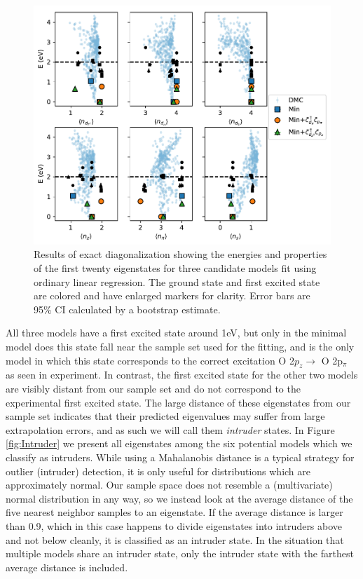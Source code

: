 \documentclass{article}
\begin{document}
\begin{figure}[H]
\centering
\includegraphics[width=0.7\linewidth]{../qwalk/old/ub3lyp_s1_/analysis/figs/init_ed.pdf}
\caption{Results of exact diagonalization showing the energies and properties of the first twenty eigenstates for three candidate models fit using ordinary linear regression. The ground state and first excited state are colored and have enlarged markers for clarity. Error bars are 95\% CI calculated by a bootstrap estimate.}
\label{fig:InitED}
\end{figure}

All three models have a first excited state around 1eV, but only in the minimal model does this state fall near the sample set used for the fitting, and is the only model in which this state corresponds to the correct excitation O 2$p_z \rightarrow $ O 2p$_\pi$ as seen in experiment.
In contrast, the first excited state for the other two models are visibly distant from our sample set and do not correspond to the experimental first excited state.
The large distance of these eigenstates from our sample set indicates that their predicted eigenvalues may suffer from large extrapolation errors, and as such we will call them \textit{intruder} states.
In Figure \ref{fig:Intruder} we present all eigenstates among the six potential models which we classify as intruders.
While using a Mahalanobis distance is a typical strategy for outlier (intruder) detection, it is only useful for distributions which are approximately normal.
Our sample space does not resemble a (multivariate) normal distribution in any way, so we instead look at the average distance of the five nearest neighbor samples to an eigenstate.
If the average distance is larger than 0.9, which in this case happens to divide eigenstates into intruders above and not below cleanly, it is classified as an intruder state.
In the situation that multiple models share an intruder state, only the intruder state with the farthest average distance is included.
\end{document}
